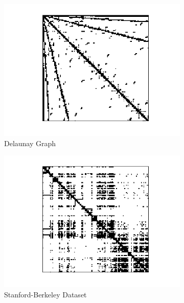 \documentclass[conference]{IEEEtran}
\begin{document}
\begin{figure}
    \centering
    \begin{subfigure}[b]{0.45\linewidth}
        \includegraphics[width=\linewidth]{images/delaunay_n23.png}
        \caption{Delaunay Graph}
        \label{fig:delaunay_n23}
    \end{subfigure}
    \hfill
    \begin{subfigure}[b]{0.45\linewidth}
        \includegraphics[width=\linewidth]{images/Stanford_Berkeley.png}
        \caption{Stanford-Berkeley Dataset}
        \label{fig:stanford_berkeley}
    \end{subfigure}
    \vspace{0.5cm}
    \begin{subfigure}[b]{0.45\linewidth}

\end{subfigure}
\end{figure}
\end{document}

